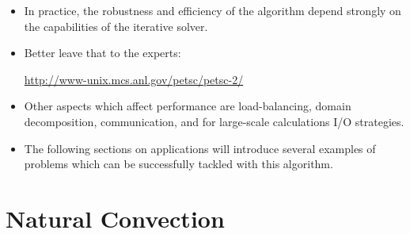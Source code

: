 \documentclass[compress,12pt]{beamer}
\begin{document}
\begin{frame}%
  \begin{itemize}
    \item In practice, the robustness and efficiency of the algorithm depend strongly
      on the capabilities of the iterative solver.
    \item Better leave that to the experts:
      \begin{center}\url{http://www-unix.mcs.anl.gov/petsc/petsc-2/}\end{center}
    \item Other aspects which affect performance are load-balancing, domain decomposition,
      communication, and for large-scale calculations I/O strategies.
    \item The following sections on applications will introduce several examples of problems
      which can be successfully tackled with this algorithm.
  \end{itemize}
\end{frame}



\section{Natural Convection}






\end{document}
